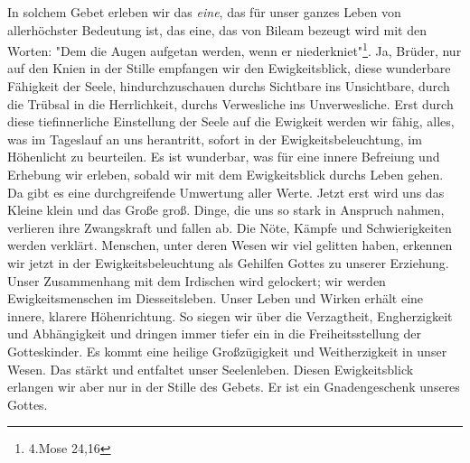 \documentclass[a5paper,openany]{book}
\begin{document}
\par
In solchem Gebet erleben wir das \emph{eine}, das für unser ganzes Leben von allerhöchster Bedeutung ist, das eine, das von Bileam bezeugt wird mit den Worten: "Dem die Augen aufgetan werden, wenn er niederkniet"\footnote{4.Mose 24,16}. Ja, Brüder, nur auf den Knien in der Stille empfangen wir den Ewigkeitsblick, diese wunderbare Fähigkeit der Seele, hindurchzuschauen durchs Sichtbare ins Unsichtbare, durch die Trübsal in die Herrlichkeit, durchs Verwesliche ins Unverwesliche. Erst durch diese tiefinnerliche Einstellung der Seele auf die Ewigkeit werden wir fähig, alles, was im Tageslauf an uns herantritt, sofort in der Ewigkeitsbeleuchtung, im Höhenlicht zu beurteilen. Es ist wunderbar, was für eine innere Befreiung und Erhebung wir erleben, sobald wir mit dem Ewigkeitsblick durchs Leben gehen. Da gibt es eine durchgreifende Umwertung aller Werte. Jetzt erst wird uns das Kleine klein und das Große groß. Dinge, die uns so stark in Anspruch nahmen, verlieren ihre Zwangskraft und fallen ab. Die Nöte, Kämpfe und Schwierigkeiten werden verklärt. Menschen, unter deren Wesen wir viel gelitten haben, erkennen wir jetzt in der Ewigkeitsbeleuchtung als Gehilfen Gottes zu unserer Erziehung. Unser Zusammenhang mit dem Irdischen wird gelockert; wir werden Ewigkeitsmenschen im Diesseitsleben. Unser Leben und Wirken erhält eine innere, klarere Höhenrichtung. So siegen wir über die Verzagtheit, Engherzigkeit und Abhängigkeit und dringen immer tiefer ein in die Freiheitsstellung der Gotteskinder. Es kommt eine heilige Großzügigkeit und Weitherzigkeit in unser Wesen. Das stärkt und entfaltet unser Seelenleben. Diesen Ewigkeitsblick erlangen wir aber nur in der Stille des Gebets. Er ist ein Gnadengeschenk unseres Gottes.
\hfill \break
\par
\end{document}
